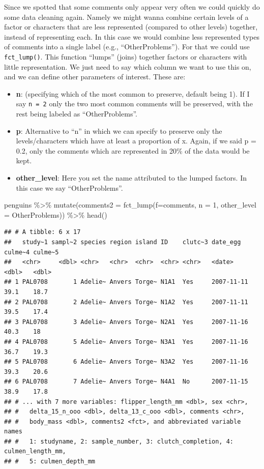 \documentclass[
]{book}
\newenvironment{Shaded}{\begin{snugshade}}{\end{snugshade}}
\newcommand{\AttributeTok}[1]{\textcolor[rgb]{0.77,0.63,0.00}{#1}}
\newcommand{\DecValTok}[1]{\textcolor[rgb]{0.00,0.00,0.81}{#1}}
\newcommand{\FunctionTok}[1]{\textcolor[rgb]{0.00,0.00,0.00}{#1}}
\newcommand{\NormalTok}[1]{#1}
\newcommand{\SpecialCharTok}[1]{\textcolor[rgb]{0.00,0.00,0.00}{#1}}
\newcommand{\StringTok}[1]{\textcolor[rgb]{0.31,0.60,0.02}{#1}}
\begin{document}
Since we spotted that some comments only appear very often we could quickly do some data cleaning again.
Namely we might wanna combine certain levels of a factor or characters that are less represented (compared to other levels) together, instead of representing each. In this case we would combine less represented types of comments into a single label (e.g., ``OtherProblems'').
For that we could use \texttt{fct\_lump()}.
This function ``lumps'' (joins) together factors or characters with little representation.
We just need to say which column we want to use this on, and we can define other parameters of interest.
These are:

\begin{itemize}
\item
  \textbf{n}: (specifying which of the most common to preserve, default being 1).
  If I say \texttt{n\ =\ 2} only the two most common comments will be preserved, with the rest being labeled as ``OtherProblems''.
\item
  \textbf{p}: Alternative to ``n'' in which we can specify to preserve only the levels/characters which have at least a proportion of x.
  Again, if we said p = 0.2, only the comments which are represented in 20\% of the data would be kept.
\item
  \textbf{other\_level}: Here you set the name attributed to the lumped factors.
  In this case we say ``OtherProblems''.
\end{itemize}

\begin{Shaded}
\begin{Highlighting}[]
\NormalTok{penguins }\SpecialCharTok{\%\textgreater{}\%} 
  \FunctionTok{mutate}\NormalTok{(}\AttributeTok{comments2 =} \FunctionTok{fct\_lump}\NormalTok{(}\AttributeTok{f=}\NormalTok{comments, }\AttributeTok{n =} \DecValTok{1}\NormalTok{, }\AttributeTok{other\_level =} \StringTok{\textquotesingle{}OtherProblems\textquotesingle{}}\NormalTok{)) }\SpecialCharTok{\%\textgreater{}\%} 
  \FunctionTok{head}\NormalTok{()}
\end{Highlighting}
\end{Shaded}

\begin{verbatim}
## # A tibble: 6 x 17
##   study~1 sampl~2 species region island ID    clutc~3 date_egg   culme~4 culme~5
##   <chr>     <dbl> <chr>   <chr>  <chr>  <chr> <chr>   <date>       <dbl>   <dbl>
## 1 PAL0708       1 Adelie~ Anvers Torge~ N1A1  Yes     2007-11-11    39.1    18.7
## 2 PAL0708       2 Adelie~ Anvers Torge~ N1A2  Yes     2007-11-11    39.5    17.4
## 3 PAL0708       3 Adelie~ Anvers Torge~ N2A1  Yes     2007-11-16    40.3    18  
## 4 PAL0708       5 Adelie~ Anvers Torge~ N3A1  Yes     2007-11-16    36.7    19.3
## 5 PAL0708       6 Adelie~ Anvers Torge~ N3A2  Yes     2007-11-16    39.3    20.6
## 6 PAL0708       7 Adelie~ Anvers Torge~ N4A1  No      2007-11-15    38.9    17.8
## # ... with 7 more variables: flipper_length_mm <dbl>, sex <chr>,
## #   delta_15_n_ooo <dbl>, delta_13_c_ooo <dbl>, comments <chr>,
## #   body_mass <dbl>, comments2 <fct>, and abbreviated variable names
## #   1: studyname, 2: sample_number, 3: clutch_completion, 4: culmen_length_mm,
## #   5: culmen_depth_mm
\end{verbatim}
\end{document}
